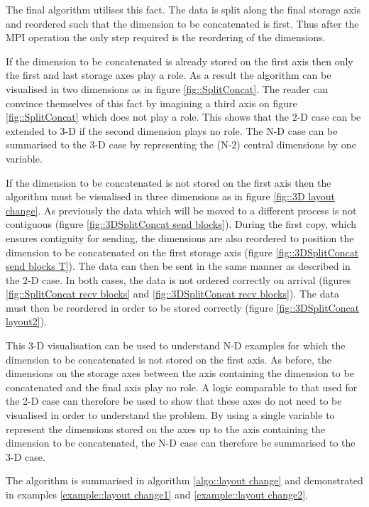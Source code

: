 The final algorithm utilises this fact. The data is split along the final storage axis and reordered such that the dimension to be concatenated is first. Thus after the MPI operation the only step required is the reordering of the dimensions.

If the dimension to be concatenated is already stored on the first axis then only the first and last storage axes play a role. As a result the algorithm can be visualised in two dimensions as in figure \ref{fig::SplitConcat}. The reader can convince themselves of this fact by imagining a third axis on figure \ref{fig::SplitConcat} which does not play a role. This shows that the 2-D case can be extended to 3-D if the second dimension plays no role. The N-D case can be summarised to the 3-D case by representing the (N-2) central dimensions by one variable.

If the dimension to be concatenated is not stored on the first axis then the algorithm must be visualised in three dimensions as in figure \ref{fig::3D layout change}. As previously the data which will be moved to a different process is not contiguous (figure \ref{fig::3DSplitConcat send blocks}). During the first copy, which ensures contiguity for sending, the dimensions are also reordered to position the dimension to be concatenated on the first storage axis (figure \ref{fig::3DSplitConcat send blocks T}). The data can then be sent in the same manner as described in the 2-D case. In both cases, the data is not ordered correctly on arrival (figures \ref{fig::SplitConcat recv blocks} and \ref{fig::3DSplitConcat recv blocks}). The data must then be reordered in order to be stored correctly (figure \ref{fig::3DSplitConcat layout2}).

This 3-D visualisation can be used to understand N-D examples for which the dimension to be concatenated is not stored on the first axis. As before, the dimensions on the storage axes between the axis containing the dimension to be concatenated and the final axis play no role. A logic comparable to that used for the 2-D case can therefore be used to show that these axes do not need to be visualised in order to understand the problem. By using a single variable to represent the dimensions stored on the axes up to the axis containing the dimension to be concatenated, the N-D case can therefore be summarised to the 3-D case.

The algorithm is summarised in algorithm \ref{algo::layout change} and demonstrated in examples \ref{example::layout change1} and  \ref{example::layout change2}.

